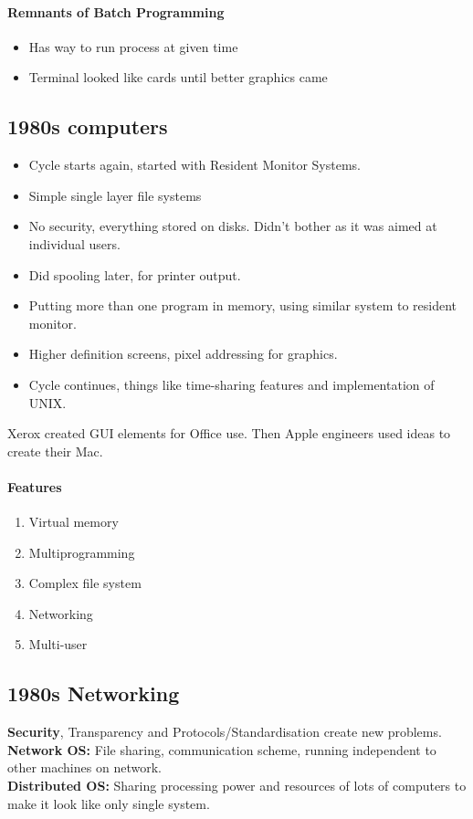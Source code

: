 \documentclass{article}
\newcommand\tab[1][0.5cm]{\hspace*{#1}}
\begin{document}
		\paragraph{\tab Remnants of Batch Programming}
		\begin{itemize}
			\item Has way to run process at given time
			\item Terminal looked like cards until better graphics came
		\end{itemize}

	\subsection{1980s computers}
		\begin{itemize}
			\item Cycle starts again, started with Resident Monitor Systems.
			\item Simple single layer file systems
			\item No security, everything stored on disks. Didn't bother as it was aimed at individual users.
			\item Did spooling later, for printer output.
			\item Putting more than one program in memory, using similar system to resident monitor.
			\item Higher definition screens, pixel addressing for graphics.
			\item Cycle continues, things like time-sharing features and implementation of UNIX.
		\end{itemize}

		Xerox created GUI elements for Office use. Then Apple engineers used ideas to create their Mac.

		\paragraph{\tab Features}
		\begin{enumerate}
			\item Virtual memory
			\item Multiprogramming
			\item Complex file system
			\item Networking
			\item Multi-user
		\end{enumerate}

	\subsection{1980s Networking}
		\textbf{Security}, Transparency and Protocols/Standardisation create new problems.\\
		\textbf{Network OS:} File sharing, communication scheme, running independent to other machines on network.\\
		\textbf{Distributed OS:} Sharing processing power and resources of lots of computers to make it look like only single system.
\end{document}

